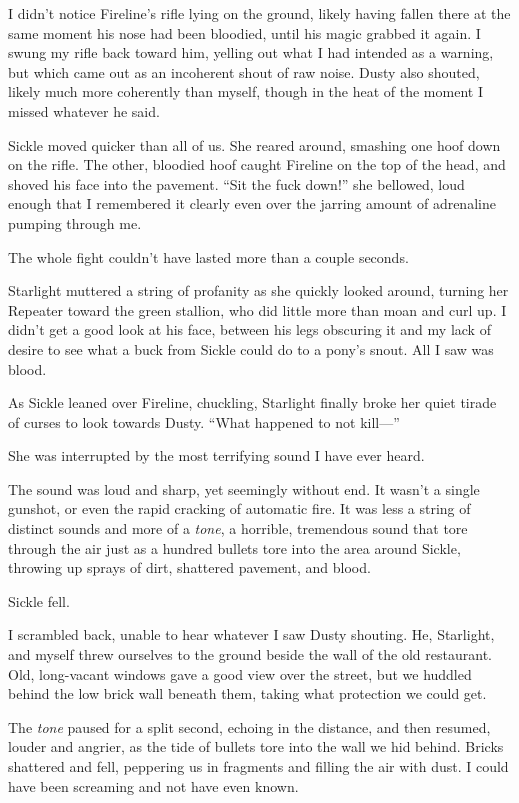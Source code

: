 I didn’t notice Fireline’s rifle lying on the ground, likely having fallen there at the same moment his nose had been bloodied, until his magic grabbed it again. I swung my rifle back toward him, yelling out what I had intended as a warning, but which came out as an incoherent shout of raw noise. Dusty also shouted, likely much more coherently than myself, though in the heat of the moment I missed whatever he said.

Sickle moved quicker than all of us. She reared around, smashing one hoof down on the rifle. The other, bloodied hoof caught Fireline on the top of the head, and shoved his face into the pavement. “Sit the fuck down!” she bellowed, loud enough that I remembered it clearly even over the jarring amount of adrenaline pumping through me.

The whole fight couldn’t have lasted more than a couple seconds.

Starlight muttered a string of profanity as she quickly looked around, turning her Repeater toward the green stallion, who did little more than moan and curl up. I didn’t get a good look at his face, between his legs obscuring it and my lack of desire to see what a buck from Sickle could do to a pony’s snout. All I saw was blood.

As Sickle leaned over Fireline, chuckling, Starlight finally broke her quiet tirade of curses to look towards Dusty. “What happened to not kill—”

She was interrupted by the most terrifying sound I have ever heard.

The sound was loud and sharp, yet seemingly without end. It wasn’t a single gunshot, or even the rapid cracking of automatic fire. It was less a string of distinct sounds and more of a \textit{tone}, a horrible, tremendous sound that tore through the air just as a hundred bullets tore into the area around Sickle, throwing up sprays of dirt, shattered pavement, and blood.

Sickle fell.

I scrambled back, unable to hear whatever I saw Dusty shouting. He, Starlight, and myself threw ourselves to the ground beside the wall of the old restaurant. Old, long-vacant windows gave a good view over the street, but we huddled behind the low brick wall beneath them, taking what protection we could get.

The \textit{tone} paused for a split second, echoing in the distance, and then resumed, louder and angrier, as the tide of bullets tore into the wall we hid behind. Bricks shattered and fell, peppering us in fragments and filling the air with dust. I could have been screaming and not have even known.

